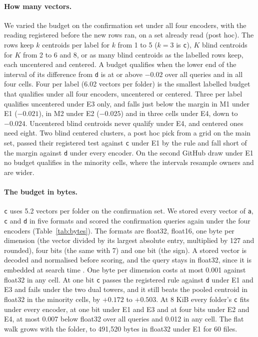 \documentclass[sigconf,natbib=true,anonymous=true]{acmart}
\newcommand{\rep}[1]{\texttt{#1}}
\begin{document}
\paragraph{How many vectors.} We varied the budget on the confirmation set under all four encoders, with the reading registered before the new rows ran, on a set already read (post hoc). The rows keep $k$ centroids per label for $k$ from 1 to 5 ($k = 3$ is \rep{c}), $K$ blind centroids for $K$ from 2 to 6 and 8, or as many blind centroids as the labelled rows keep, each uncentered and centered. A budget qualifies when the lower end of the interval of its difference from \rep{d} is at or above $-0.02$ over all queries and in all four cells. Four per label (6.02 vectors per folder) is the smallest labelled budget that qualifies under all four encoders, uncentered or centered. Three per label qualifies uncentered under E3 only, and falls just below the margin in M1 under E1 ($-0.021$), in M2 under E2 ($-0.025$) and in three cells under E4, down to $-0.024$. Uncentered blind centroids never qualify under E4, and centered ones need eight. Two blind centered clusters, a post hoc pick from a grid on the main set, passed their registered test against \rep{c} under E1 by the rule and fall short of the margin against \rep{d} under every encoder. On the second GitHub draw under E1 no budget qualifies in the minority cells, where the intervals resample owners and are wider.

\paragraph{The budget in bytes.} \rep{c} uses 5.2 vectors per folder on the confirmation set. We stored every vector of \rep{a}, \rep{c} and \rep{d} in five formats and scored the confirmation queries again under the four encoders (Table~\ref{tab:bytes}). The formats are float32, float16, one byte per dimension (the vector divided by its largest absolute entry, multiplied by 127 and rounded), four bits (the same with 7) and one bit (the sign). A stored vector is decoded and normalised before scoring, and the query stays in float32, since it is embedded at search time \citep{shakir2024quantization}. One byte per dimension costs at most 0.001 against float32 in any cell. At one bit \rep{c} passes the registered rule against \rep{d} under E1 and E3 and fails under the two dual towers, and it still beats the pooled centroid in float32 in the minority cells, by $+0.172$ to $+0.503$. At 8 KiB every folder's \rep{c} fits under every encoder, at one bit under E1 and E3 and at four bits under E2 and E4, at most 0.007 below float32 over all queries and 0.012 in any cell. The flat walk grows with the folder, to 491,520 bytes in float32 under E1 for 60 files.
\end{document}

